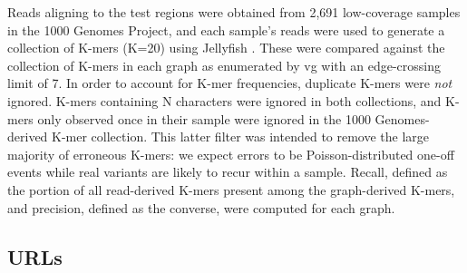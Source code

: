 Reads aligning to the test regions were obtained from 2,691 low-coverage
samples in the 1000 Genomes Project, and each sample's reads were used
to generate a collection of K-mers (K=20) using Jellyfish
\cite{Marcais2011-ck,10002015global}. These were
compared against the collection of K-mers in each graph as enumerated by
vg with an edge-crossing limit of 7. In order to account for K-mer
frequencies, duplicate K-mers were \emph{not} ignored. K-mers containing
N characters were ignored in both collections, and K-mers only observed
once in their sample were ignored in the 1000 Genomes-derived K-mer
collection. This latter filter was intended to remove the large majority
of erroneous K-mers: we expect errors to be Poisson-distributed one-off
events while real variants are likely to recur within a sample. Recall,
defined as the portion of all read-derived K-mers present among the
graph-derived K-mers, and precision, defined as the converse, were
computed for each graph.

\subsection{URLs}

